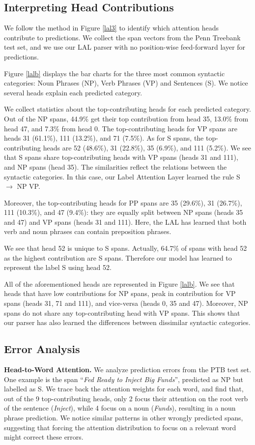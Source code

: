 \documentclass[11pt,a4paper]{article}
\begin{document}
\subsection{Interpreting Head Contributions}

We follow the method in Figure \ref{lal3} to identify which attention heads contribute to predictions. We collect the span vectors from the Penn Treebank test set, and we use our LAL parser with no position-wise feed-forward layer for predictions.

Figure \ref{lalb} displays the bar charts for the three most common syntactic categories: Noun Phrases (NP), Verb Phrases (VP) and Sentences (S). We notice several heads explain each predicted category.

We collect statistics about the top-contributing heads for each predicted category. Out of the NP spans, 44.9\% get their top contribution from head 35, 13.0\% from head 47, and 7.3\% from head 0. The top-contributing heads for VP spans are heads 31 (61.1\%), 111 (13.2\%), and 71 (7.5\%). As for S spans, the top-contributing heads are 52 (48.6\%), 31 (22.8\%), 35 (6.9\%), and 111 (5.2\%). We see that S spans share top-contributing heads with VP spans (heads 31 and 111), and NP spans (head 35). The similarities reflect the relations between the syntactic categories. In this case, our Label Attention Layer learned the rule S $\rightarrow$ NP VP.

Moreover, the top-contributing heads for PP spans are 35 (29.6\%), 31 (26.7\%), 111 (10.3\%), and 47 (9.4\%): they are equally split between NP spans (heads 35 and 47) and VP spans (heads 31 and 111). Here, the LAL has learned that both verb and noun phrases can contain preposition phrases.

We see that head 52 is unique to S spans. Actually, 64.7\% of spans with head 52 as the highest contribution are S spans. Therefore our model has learned to represent the label S using head 52.

All of the aforementioned heads are represented in Figure \ref{lalb}. We see that heads that have low contributions for NP spans, peak in contribution for VP spans (heads 31, 71 and 111), and vice-versa (heads 0, 35 and 47). Moreover, NP spans do not share any top-contributing head with VP spans. This shows that our parser has also learned the differences between dissimilar syntactic categories.

\subsection{Error Analysis}
{\bf Head-to-Word Attention. } We analyze prediction errors from the PTB test set. One example is the span ``\textit{Fed Ready to Inject Big Funds}'', predicted as NP but labelled as S. We trace back the attention weights for each word, and find that, out of the 9 top-contributing heads, only 2 focus their attention on the root verb of the sentence (\textit{Inject}), while 4 focus on a noun (\textit{Funds}), resulting in a noun phrase prediction. We notice similar patterns in other wrongly predicted spans, suggesting that forcing the attention distribution to focus on a relevant word might correct these errors.
\end{document}
